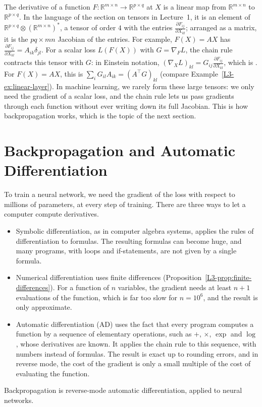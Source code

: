 \begin{remark}
    The derivative of a function $F: \mathbb{R}^{m \times n} \to \mathbb{R}^{p \times q}$ at $X$ is a linear map from $\mathbb{R}^{m \times n}$ to $\mathbb{R}^{p \times q}$. In the language of the section on tensors in Lecture~1, it is an element of $\mathbb{R}^{p \times q} \otimes (\mathbb{R}^{m \times n})^*$, a tensor of order $4$ with the entries $\frac{\partial F_{ij}}{\partial X_{kl}}$; arranged as a matrix, it is the $pq \times mn$ Jacobian of the entries. For example, $F(X) = AX$ has $\frac{\partial F_{ij}}{\partial X_{kl}} = A_{ik}\delta_{jl}$. For a scalar loss $L(F(X))$ with $G = \nabla_F L$, the chain rule contracts this tensor with $G$: in Einstein notation, $(\nabla_X L)_{kl} = G_{ij}\frac{\partial F_{ij}}{\partial X_{kl}}$, which is . For $F(X) = AX$, this is $\sum_i G_{il}A_{ik} = (A^\top G)_{kl}$ (compare Example~\ref{L3-ex:linear-layer}). In machine learning, we rarely form these large tensors: we only need the gradient of a scalar loss, and the chain rule lets us pass gradients through each function without ever writing down its full Jacobian. This is how backpropagation works, which is the topic of the next section.
\end{remark}

\section{Backpropagation and Automatic Differentiation}\label{L3-sec:autodiff}

To train a neural network, we need the gradient of the loss with respect to millions of parameters, at every step of training. There are three ways to let a computer compute derivatives.
\begin{itemize}
    \item Symbolic differentiation, as in computer algebra systems, applies the rules of differentiation to formulas. The resulting formulas can become huge, and many programs, with loops and if-statements, are not given by a single formula.
    \item Numerical differentiation uses finite differences (Proposition~\ref{L3-prop:finite-differences}). For a function of $n$ variables, the gradient needs at least $n + 1$ evaluations of the function, which is far too slow for $n = 10^6$, and the result is only approximate.
    \item Automatic differentiation (AD) uses the fact that every program computes a function by a sequence of elementary operations, such as $+$, $\times$, $\exp$ and $\log$, whose derivatives are known. It applies the chain rule to this sequence, with numbers instead of formulas. The result is exact up to rounding errors, and in reverse mode, the cost of the gradient is only a small multiple of the cost of evaluating the function.
\end{itemize}
Backpropagation is reverse-mode automatic differentiation, applied to neural networks.

